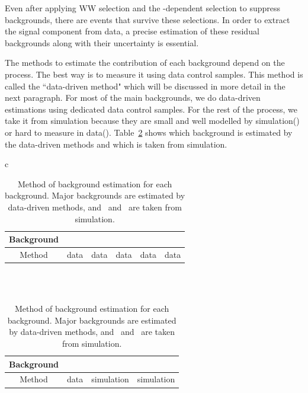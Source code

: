 Even after applying WW selection and the \mHi-dependent selection to suppress 
backgrounds, there are events that survive these selections. In order to extract 
the signal component from data, a precise estimation of these residual backgrounds 
along with their uncertainty is essential. 

The methods to estimate the contribution of each background depend on the process. 
The best way is to measure it using data control samples. This method is 
called the ``data-driven method" which will be discussed in more detail in the next paragraph. 
For most of the main backgrounds, we do data-driven estimations using dedicated
data control samples. For the rest of the process, we take it from simulation
because they are small and well modelled by simulation(\vv) or hard to measure in data(\wgamma). 
Table~\ref{tab:overview_bkgest} shows which background is estimated by the
data-driven methods and which is taken from simulation. 

%
\begin{table}[htp] 
\begin{center} 
\vspace{0.5cm}
\caption{Method of background estimation for each background. Major backgrounds 
are estimated by data-driven methods, and \wgamma\ and  \vv\ are taken 
from simulation.} 
\label{tab:overview_bkgest} 
\vspace{0.5cm}
\begin{tabular}{c}   

    \begin{tabular}{c|c|c|c|c|c}   
    \hline 
    Background     & \qqww & \topbkg & \dyll & \Wjets & \wgammastar  \\
    \hline 
    \hline 
    Method         & data & data & data & data & data \\ 
    \hline 
    \end{tabular} 
    \\
    \\
    \begin{tabular}{c|c|c|c}   
    \hline 
    Background     & \ggww & \wgamma & \vv \\
    \hline 
    \hline 
    Method         & data & simulation & simulation \\ 
    \hline 
    \end{tabular} 

\end{tabular} 
\end{center} 
\end{table} 

